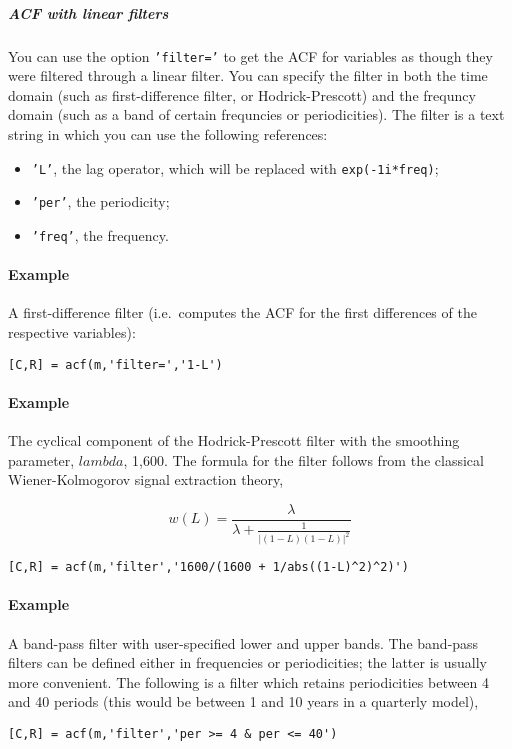 \subparagraph{ACF with linear filters}\label{acf-with-linear-filters}

You can use the option \texttt{'filter='} to get the ACF for variables
as though they were filtered through a linear filter. You can specify
the filter in both the time domain (such as first-difference filter, or
Hodrick-Prescott) and the frequncy domain (such as a band of certain
frequncies or periodicities). The filter is a text string in which you
can use the following references:

\begin{itemize}
\itemsep1pt\parskip0pt
\item
  \texttt{'L'}, the lag operator, which will be replaced with
  \texttt{exp(-1i*freq)};
\item
  \texttt{'per'}, the periodicity;
\item
  \texttt{'freq'}, the frequency.
\end{itemize}

\paragraph{Example}\label{example}

A first-difference filter (i.e.~computes the ACF for the first
differences of the respective variables):

\begin{verbatim}
[C,R] = acf(m,'filter=','1-L')
\end{verbatim}

\paragraph{Example}\label{example-1}

The cyclical component of the Hodrick-Prescott filter with the smoothing
parameter, $lambda$, 1,600. The formula for the filter follows from the
classical Wiener-Kolmogorov signal extraction theory,

\[w(L) = \frac{\lambda}{\lambda + \frac{1}{ | (1-L)(1-L) | ^2}}\]

\begin{verbatim}
[C,R] = acf(m,'filter','1600/(1600 + 1/abs((1-L)^2)^2)')
\end{verbatim}

\paragraph{Example}\label{example-2}

A band-pass filter with user-specified lower and upper bands. The
band-pass filters can be defined either in frequencies or periodicities;
the latter is usually more convenient. The following is a filter which
retains periodicities between 4 and 40 periods (this would be between 1
and 10 years in a quarterly model),

\begin{verbatim}
[C,R] = acf(m,'filter','per >= 4 & per <= 40')
\end{verbatim}


